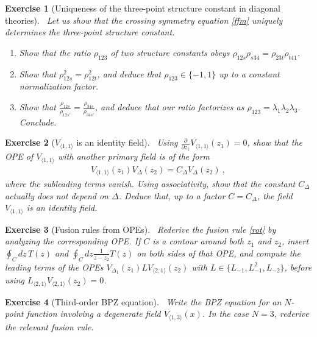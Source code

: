 \documentclass[12pt, a4paper, notitlepage, twoside]{report}
\numberwithin{equation}{section}
\theoremstyle{break}
\newtheorem{exo}{Exercise}[chapter]
\begin{document}
\begin{exo}[Uniqueness of the three-point structure constant in diagonal theories]
 ~\label{exoudt}
 Let us show that the crossing symmetry equation \eqref{ffm} uniquely determines the three-point structure constant. 
 \begin{enumerate}
  \item Show that the ratio $\rho_{123}$ of two structure constants obeys $\rho_{12s}\rho_{s34} = \rho_{23t}\rho_{t41}$.
  \item Show that $\rho_{12s}^2 = \rho_{12t}^2$, and deduce that $\rho_{123}\in\{-1,1\}$ up to a constant normalization factor.
  \item Show that $\frac{\rho_{12s}}{\rho_{12s'}} = \frac{\rho_{34s}}{\rho_{34s'}} $, and deduce that our ratio factorizes as $\rho_{123} = \lambda_1\lambda_2\lambda_3$. Conclude.
 \end{enumerate} 
\end{exo}

\begin{exo}[$V_{\langle 1,1\rangle}$ is an identity field]
~\label{exoid}
Using $\frac{\partial}{\partial z_1} V_{\langle 1,1\rangle}(z_1)=0$, show that the OPE of $V_{\langle 1,1\rangle}$ with another primary field is of the form 
\begin{align}
 V_{\langle 1,1\rangle}(z_1)V_\Delta(z_2) = C_\Delta V_\Delta(z_2)\ ,
\end{align}
where the subleading terms vanish. Using associativity, show that the constant $C_\Delta$ actually does not depend on $\Delta$. Deduce that, up to a factor $C=C_\Delta$, the field $V_{\langle 1,1\rangle}$ is an identity field.
\end{exo}

\begin{exo}[Fusion rules from OPEs]
 ~\label{exooit}
Rederive the fusion rule \eqref{rot} by analyzing the corresponding OPE.
If $C$ is a contour around both $z_1$ and $z_2$, insert $\oint_C dz\, T(z)$ and $\oint_C dz \frac{1}{z-z_2}T(z)$ on both sides of that OPE, and compute the leading terms of the OPEs $V_{\Delta_1}(z_1) LV_{\langle 2,1 \rangle}(z_2)$ with $L\in\{L_{-1},L_{-1}^2,L_{-2}\}$, before using $L_{\langle 2,1 \rangle} V_{\langle 2,1 \rangle} (z_2) =0$. 
\end{exo}


\begin{exo}[Third-order BPZ equation]
 ~\label{exotob}
 Write the BPZ equation for an $N$-point function involving a degenerate field $V_{\langle 1,3 \rangle}(x)$.
In the case $N=3$, rederive the relevant fusion rule.
\end{exo}
\end{document}
